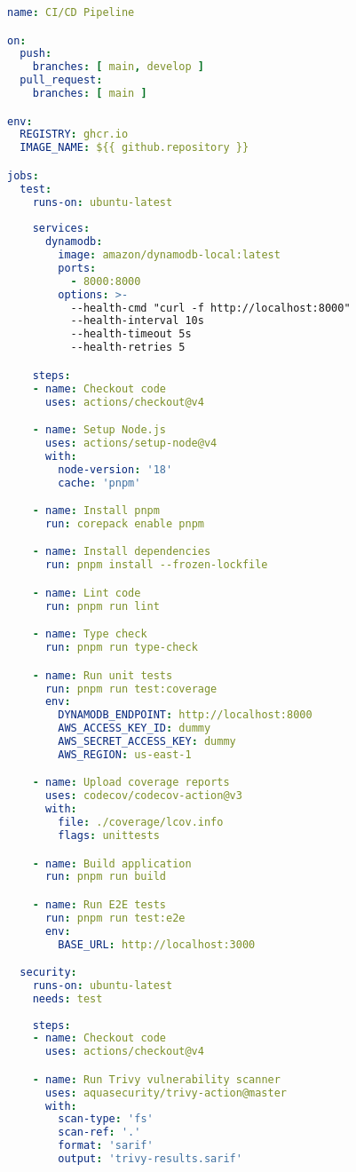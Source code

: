 \begin{lstlisting}[language=YAML, caption=.github/workflows/ci-cd.yml]
name: CI/CD Pipeline

on:
  push:
    branches: [ main, develop ]
  pull_request:
    branches: [ main ]

env:
  REGISTRY: ghcr.io
  IMAGE_NAME: ${{ github.repository }}

jobs:
  test:
    runs-on: ubuntu-latest
    
    services:
      dynamodb:
        image: amazon/dynamodb-local:latest
        ports:
          - 8000:8000
        options: >-
          --health-cmd "curl -f http://localhost:8000"
          --health-interval 10s
          --health-timeout 5s
          --health-retries 5

    steps:
    - name: Checkout code
      uses: actions/checkout@v4

    - name: Setup Node.js
      uses: actions/setup-node@v4
      with:
        node-version: '18'
        cache: 'pnpm'

    - name: Install pnpm
      run: corepack enable pnpm

    - name: Install dependencies
      run: pnpm install --frozen-lockfile

    - name: Lint code
      run: pnpm run lint

    - name: Type check
      run: pnpm run type-check

    - name: Run unit tests
      run: pnpm run test:coverage
      env:
        DYNAMODB_ENDPOINT: http://localhost:8000
        AWS_ACCESS_KEY_ID: dummy
        AWS_SECRET_ACCESS_KEY: dummy
        AWS_REGION: us-east-1

    - name: Upload coverage reports
      uses: codecov/codecov-action@v3
      with:
        file: ./coverage/lcov.info
        flags: unittests

    - name: Build application
      run: pnpm run build

    - name: Run E2E tests
      run: pnpm run test:e2e
      env:
        BASE_URL: http://localhost:3000

  security:
    runs-on: ubuntu-latest
    needs: test
    
    steps:
    - name: Checkout code
      uses: actions/checkout@v4

    - name: Run Trivy vulnerability scanner
      uses: aquasecurity/trivy-action@master
      with:
        scan-type: 'fs'
        scan-ref: '.'
        format: 'sarif'
        output: 'trivy-results.sarif'


\end{lstlisting}
